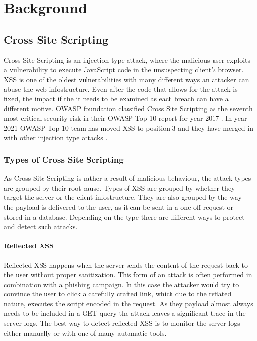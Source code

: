 \chapter{Background}

\section{Cross Site Scripting}
Cross Site Scripting is an injection type attack, where the malicious user exploits a vulnerability to execute JavaScript code in the unsuspecting client's browser.
XSS is one of the oldest vulnerabilities with many different ways an attacker can abuse the web infostructure.
Even after the code that allows for the attack is fixed, the impact if the it needs to be examined as each breach can have a different motive.
OWASP foundation classified Cross Site Scripting as the seventh most critical security risk in their OWASP Top 10 report for year 2017 \cite{owaspTop102017}.
In year 2021 OWASP Top 10 team has moved XSS to position 3 and they have merged in with other injection type attacks \cite{owaspTop10}.

\subsection{Types of Cross Site Scripting}
As Cross Site Scripting is rather a result of malicious behaviour, the attack types are grouped by their root cause.
Types of XSS are grouped by whether they target the server or the client infostructure.
They are also grouped by the way the payload is delivered to the user, as it can be sent in a one-off request or stored in a database.
Depending on the type there are different ways to protect and detect such attacks.

\subsubsection{Reflected XSS}
Reflected XSS happens when the server sends the content of the request back to the user without proper sanitization.
This form of an attack is often performed in combination with a phishing campaign.
In this case the attacker would try to convince the user to click a carefully crafted link, which due to the reflated nature, executes the script encoded in the request.
As they payload almost always needs to be included in a GET query the attack leaves a significant trace in the server logs.
The best way to detect reflected XSS is to monitor the server logs either manually or with one of many automatic tools.

